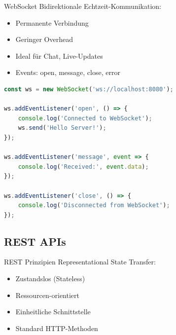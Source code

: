 \begin{concept}{WebSocket}
    Bidirektionale Echtzeit-Kommunikation:
    \begin{itemize}
        \item Permanente Verbindung
        \item Geringer Overhead
        \item Ideal für Chat, Live-Updates
        \item Events: open, message, close, error
    \end{itemize}

\begin{lstlisting}[language=JavaScript, style=basesmol]
const ws = new WebSocket('ws://localhost:8080');

ws.addEventListener('open', () => {
    console.log('Connected to WebSocket');
    ws.send('Hello Server!');
});

ws.addEventListener('message', event => {
    console.log('Received:', event.data);
});

ws.addEventListener('close', () => {
    console.log('Disconnected from WebSocket');
});
\end{lstlisting}
\end{concept}

\subsection{REST APIs}

\begin{definition}{REST Prinzipien}
    Representational State Transfer:
    \begin{itemize}
        \item Zustandslos (Stateless)
        \item Ressourcen-orientiert
        \item Einheitliche Schnittstelle
        \item Standard HTTP-Methoden
    \end{itemize}
\end{definition}



